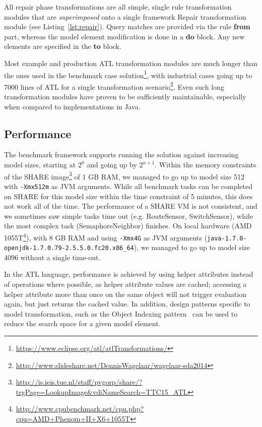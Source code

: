 \documentclass[submission,copyright,creativecommons]{eptcs}
\begin{document}
All repair phase transformations are all simple, single rule transformation modules that are \emph{superimposed} onto a single framework Repair transformation module (see Listing~\ref{lst:repair}). Query matches are provided via the rule \textbf{from} part, whereas the model element modification is done in a \textbf{do} block. Any new elements are specified in the \textbf{to} block.

Most example and production ATL transformation modules are much longer than the ones used in the benchmark case solution\footnote{\url{https://www.eclipse.org/atl/atlTransformations/}}, with industrial cases going up to 7000 lines of ATL for a single transformation scenario\footnote{\url{http://www.slideshare.net/DennisWagelaar/wagelaar-sda2014}}. Even such long transformation modules have proven to be sufficiently maintainable, especially when compared to implementations in Java.

\subsection{Performance}

The benchmark framework supports running the solution against increasing model sizes, starting at $2^0$ and going up by $2^{n+1}$. Within the memory constraints of the SHARE image\footnote{\url{http://is.ieis.tue.nl/staff/pvgorp/share/?trgPage=LookupImage&vdiNameSearch=TTC15_ATL}} of 1 GB RAM, we managed to go up to model size 512 with \texttt{-Xmx512m} as JVM arguments. While all benchmark tasks can be completed on SHARE for this model size within the time constraint of 5 minutes, this does not work all of the time. The performance of a SHARE VM is not consistent, and we sometimes saw simple tasks time out (e.g. RouteSensor, SwitchSensor), while the most complex task (SemaphoreNeighbor) finishes. On local hardware (AMD 1055T\footnote{\url{http://www.cpubenchmark.net/cpu.php?cpu=AMD+Phenom+II+X6+1055T}}), with 8 GB RAM and using \texttt{-Xmx4G} as JVM arguments (\texttt{java-1.7.0-openjdk-1.7.0.79-2.5.5.0.fc20.x86\_64}), we managed to go up to model size 4096 without a single time-out.

In the ATL language, performance is achieved by using helper attributes instead of operations where possible, as helper attribute values are cached; accessing a helper attribute more than once on the same object will not trigger evaluation again, but just returns the cached value. In addition, design patterns specific to model transformation, such as the Object Indexing pattern~\cite{conf/icsea/Lano2011} can be used to reduce the search space for a given model element.
\end{document}
